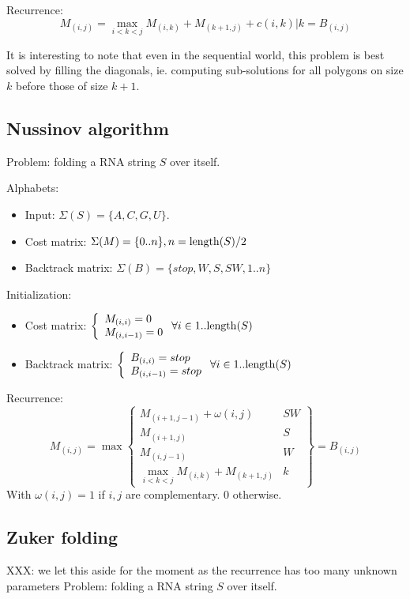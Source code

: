 \documentclass[11pt]{article}
\def\ul{\begin{itemize}}
\def\ule{\end{itemize}}
\begin{document}
Recurrence:
\[M_{(i,j)}= \max_{i<k<j}M_{(i,k)}+M_{(k+1,j)} + c(i,k) | k = B_{(i,j)} \]

It is interesting to note that even in the sequential world, this problem is best solved 
by filling the diagonals, ie. computing sub-solutions for all polygons on size $k$ before
those of size $k+1$.



\newpage
\subsection{Nussinov algorithm}
Problem: folding a RNA string $S$ over itself.

Alphabets:\ul
\item Input: $\Sigma(S)=\{A,C,G,U\}$.
\item Cost matrix: $\Sigma(M)=\{0..n\}, n={\rm length}(S)/2$
\item Backtrack matrix: $\Sigma(B)=\{stop,W,S,SW, 1..n\}$
\ule

Initialization: \ul
\item Cost matrix: $\left\{\begin{array}{l} M_{(i,i)}=0 \\ M_{(i,i-1)}=0 \end{array}\right. \forall i \in 1..{\rm length}(S)$
\item Backtrack matrix: $\left\{\begin{array}{l} B_{(i,i)}=stop \\ B_{(i,i-1)}=stop \end{array}\right.  \forall i \in 1..{\rm length}(S)$
\ule

Recurrence:
\[M_{(i,j)}=\max\left\{\begin{array}{l|l}
	M_{(i+1,j-1)}+\omega(i,j) & SW\\
	M_{(i+1,j)} & S\\
	M_{(i,j-1)} & W\\
	\max_{i<k<j}M_{(i,k)}+M_{(k+1,j)} & k
\end{array}\right\} = B_{(i,j)} \]
With $\omega(i,j)=1$ if $i,j$ are complementary. 0 otherwise.

\newpage
\subsection{Zuker folding}
XXX: we let this aside for the moment as the recurrence has too many unknown parameters
Problem: folding a RNA string $S$ over itself.
\end{document}
